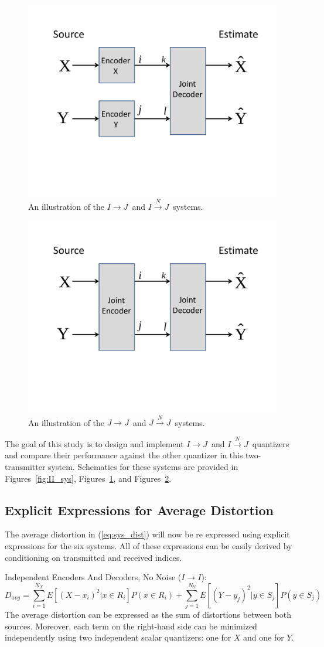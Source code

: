\documentclass[10pt,twoside,titlepage]{article}
\newcommand{\sysII}{\mbox{$I \rightarrow I$}}
\newcommand{\sysIJN}{\mbox{$I \overset{N}{\rightarrow} J$}}
\newcommand{\sysIJ}{\mbox{$I \rightarrow J$}}
\newcommand{\sysJJN}{\mbox{$J \overset{N}{\rightarrow} J$}}
\newcommand{\sysJJ}{\mbox{$J \rightarrow J$}}
\begin{document}
\begin{figure}
        \centering
        \includegraphics[width=0.4\linewidth]{IJ.pdf}
    \caption{An illustration of the \sysIJ\ and \sysIJN\ systems.}
    \label{fig:IJ_sys}
\end{figure}

\begin{figure}
        \centering
        \includegraphics[width=0.4\linewidth]{JJ.pdf}
    \caption{An illustration of the \sysJJ\ and \sysJJN\ systems.}
    \label{fig:JJ_sys}
\end{figure}

The goal of this study is to design and implement \sysIJ\ and \sysIJN\ quantizers and compare their performance against the other quantizer in this two-transmitter system. Schematics for these systems are provided in Figures~\ref{fig:II_sys}, Figures~\ref{fig:IJ_sys}, and Figures~\ref{fig:JJ_sys}.

\subsection{Explicit Expressions for Average Distortion}
The average distortion in (\ref{eq:sys_dist}) will now be re expressed using explicit expressions for the six systems. All of these expressions can be easily derived by conditioning on transmitted and received indices. 

\medskip
{\sc \noindent Independent Encoders And Decoders, No Noise (\sysII):}
\begin{equation}
    \label{eq:dist_indep_nonoise}
    D_{avg} = \sum_{i=1}^{N_X}E[{(X-x_i)}^2 | x \in R_i]P(x \in R_i) + \sum_{j=1}^{N_Y}E[{(Y-y_j)}^2 | y \in S_j]P(y \in S_j)
\end{equation}
The average distortion can be expressed as the sum of distortions between both sources. Moreover, each term on the right-hand side can be minimized independently using two independent scalar quantizers: one for $X$ and one for $Y$.
\end{document}
